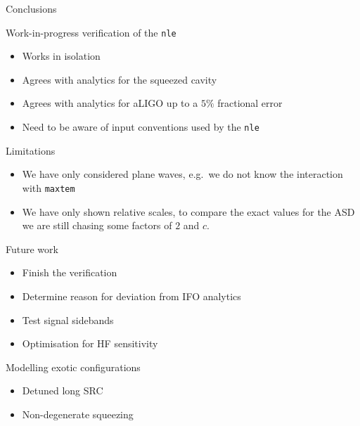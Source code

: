 \documentclass[12pt]{beamer}
\newcommand{\code}[1]{\texttt{#1}}
\begin{document}
\begin{frame}{Conclusions}
\begin{block}{Work-in-progress verification of the \code{nle}}
\begin{itemize}
\item Works in isolation 
\item Agrees with analytics for the squeezed cavity
\item Agrees with analytics for aLIGO up to a $5\%$ fractional error
\item Need to be aware of input conventions used by the \code{nle}
\end{itemize}
\end{block}

\begin{alertblock}{Limitations}
\begin{itemize}
\item We have only considered plane waves, e.g.\ we do not know the interaction with \code{maxtem}
\item We have only shown relative scales, to compare the exact values for the ASD we are still chasing some factors of $2$ and $c$.
\end{itemize}
\end{alertblock}
\end{frame}

\begin{frame}{Future work}
\begin{itemize}
\item Finish the verification
\item Determine reason for deviation from IFO analytics
\item Test signal sidebands
\item Optimisation for HF sensitivity
\end{itemize}
\begin{block}{Modelling exotic configurations}
\begin{itemize}
\item Detuned long SRC
\item Non-degenerate squeezing
\end{itemize}
\end{block}
\end{frame}


\begin{frame}[noframenumbering]
\titlepage 
\end{frame}
\end{document}
